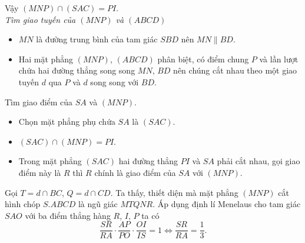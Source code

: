 \begin{ex}
{\begin{itemchoice}
			Vậy $(MNP)  \cap (SAC)=PI$.\\
			\textit{Tìm giao tuyến của $(MNP)$ và  $(ABCD)$}
			\begin{itemize}
				\item $MN$ là đường trung bình của tam giác $SBD$ nên $MN  \parallel BD$.
				\item Hai mặt phẳng $(MNP)$, $(ABCD)$ phân biệt, có điểm chung $P$ và lần lượt chứa hai đường thẳng song song $MN$, $BD$ nên chúng cắt nhau theo một giao tuyến $d$ qua $P$ và $d$ song song  với $BD$.
			\end{itemize}
			\itemch Tìm giao điểm của $SA$ và  $(MNP)$.
			\begin{itemize}
				\item Chọn mặt phẳng phụ chứa $SA$  là $(SAC)$.
				\item $(SAC)\cap (MNP)=PI$. 
				\item Trong mặt phẳng $(SAC)$ hai  đường thẳng $PI$ và $SA$ phải cắt nhau, gọi giao điểm này là $R$ thì $R$ chính là giao điểm của $SA$ với $(MNP)$.
			\end{itemize}
			\itemch Gọi  $T=d\cap BC$, $Q=d\cap CD$. Ta thấy, thiết diện mà mặt phẳng $(MNP)$ cắt hình chóp $S.ABCD$ là ngũ giác $MTQNR$.
			\itemch Áp dụng định lí Menelaus cho tam  giác $SAO$ với ba điểm thẳng hàng $R$, $I$, $P$ ta có
			 $$\dfrac{SR}{RA}\cdot\dfrac{AP}{PO}\cdot\dfrac{OI}{IS}=1\Leftrightarrow \dfrac{SR}{RA}=\dfrac{1}{3}.$$
		\end{itemchoice}
	 }
\end{ex}

